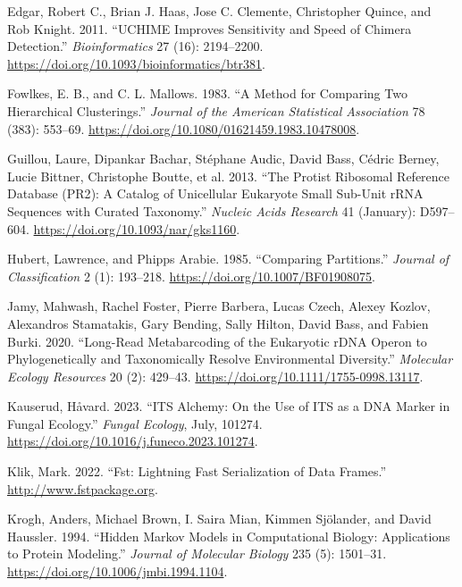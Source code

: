 \documentclass[
]{article}
\newlength{\cslhangindent}
\newenvironment{CSLReferences}[2] %
 {\begin{list}{}{%
  \setlength{\itemindent}{0pt}
  \setlength{\leftmargin}{0pt}
  \setlength{\parsep}{0pt}
  \ifodd #1
   \setlength{\leftmargin}{\cslhangindent}
   \setlength{\itemindent}{-1\cslhangindent}
  \fi
  \setlength{\itemsep}{#2\baselineskip}}}
 {\end{list}}
\begin{document}
\begin{CSLReferences}{1}{0}
Edgar, Robert C., Brian J. Haas, Jose C. Clemente, Christopher Quince, and Rob Knight. 2011. {``{UCHIME} Improves Sensitivity and Speed of Chimera Detection.''} \emph{Bioinformatics} 27 (16): 2194--2200. \url{https://doi.org/10.1093/bioinformatics/btr381}.

Fowlkes, E. B., and C. L. Mallows. 1983. {``A {Method} for {Comparing Two Hierarchical Clusterings}.''} \emph{Journal of the American Statistical Association} 78 (383): 553--69. \url{https://doi.org/10.1080/01621459.1983.10478008}.

Guillou, Laure, Dipankar Bachar, Stéphane Audic, David Bass, Cédric Berney, Lucie Bittner, Christophe Boutte, et al. 2013. {``The {Protist Ribosomal Reference} Database ({PR2}): A Catalog of Unicellular Eukaryote Small Sub-Unit {rRNA} Sequences with Curated Taxonomy.''} \emph{Nucleic Acids Research} 41 (January): D597--604. \url{https://doi.org/10.1093/nar/gks1160}.

Hubert, Lawrence, and Phipps Arabie. 1985. {``Comparing Partitions.''} \emph{Journal of Classification} 2 (1): 193--218. \url{https://doi.org/10.1007/BF01908075}.

Jamy, Mahwash, Rachel Foster, Pierre Barbera, Lucas Czech, Alexey Kozlov, Alexandros Stamatakis, Gary Bending, Sally Hilton, David Bass, and Fabien Burki. 2020. {``Long-Read Metabarcoding of the Eukaryotic {rDNA} Operon to Phylogenetically and Taxonomically Resolve Environmental Diversity.''} \emph{Molecular Ecology Resources} 20 (2): 429--43. \url{https://doi.org/10.1111/1755-0998.13117}.

Kauserud, Håvard. 2023. {``{ITS} Alchemy: {On} the Use of {ITS} as a {DNA} Marker in Fungal Ecology.''} \emph{Fungal Ecology}, July, 101274. \url{https://doi.org/10.1016/j.funeco.2023.101274}.

Klik, Mark. 2022. {``Fst: {Lightning} Fast Serialization of Data Frames.''} \url{http://www.fstpackage.org}.

Krogh, Anders, Michael Brown, I. Saira Mian, Kimmen Sjölander, and David Haussler. 1994. {``Hidden {Markov Models} in {Computational Biology}: {Applications} to {Protein Modeling}.''} \emph{Journal of Molecular Biology} 235 (5): 1501--31. \url{https://doi.org/10.1006/jmbi.1994.1104}.


\end{CSLReferences}
\end{document}
